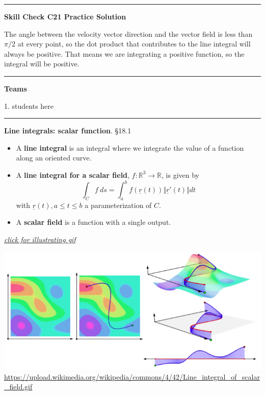 \documentclass[12pt,letterpaper,noanswers]{exam}
\newcommand{\mb}[1]{\underline{#1}}
\begin{document}
\vspace{0.2cm}
\hrule
\vspace{0.2cm}

\noindent\textbf{Skill Check C21 Practice Solution}
\begin{questions}
\question The angle between the velocity vector direction and the vector field is less than $\pi/2$ at every point, so the dot product that contributes to the line integral will always be positive.  That means we are integrating a positive function, so the integral will be positive.
\end{questions}

\vspace{0.2cm}
\hrule
\vspace{0.2cm}

\noindent\textbf{Teams}
\begin{multicols}{2}

1.  students here

\end{multicols}

\eject
\vspace{0.2cm}
\hrule
\vspace{0.2cm}

\noindent\textbf{Line integrals: scalar function}.  \S 18.1  

\begin{tcolorbox}
\begin{itemize}
\itemsep0em
    \item A \textbf{line integral} is an integral where we integrate the value of a function along an oriented curve.
    \item A \textbf{line integral for a scalar field}, $f:\mathbb{R}^3 \rightarrow \mathbb{R}$, is given by \[\int_C f\ ds = \int_a^b f(\mb r(t)) \Vert \mb r'(t)\Vert dt\] with $\mb r(t), a\leq t\leq b$ a parameterization of $C$.
    \item A \textbf{scalar field} is a function with a single output.
\end{itemize}
\end{tcolorbox}


\href{https://upload.wikimedia.org/wikipedia/commons/4/42/Line_integral_of_scalar_field.gif}{\emph{click for illustrating gif}}


\includegraphics[width=\linewidth]{img/C25p1-18.png}
\url{https://upload.wikimedia.org/wikipedia/commons/4/42/Line_integral_of_scalar_field.gif}
\end{document}
